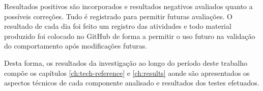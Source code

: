 Resultados positivos são incorporados e resultados negativos avaliados quanto a possíveis correções. Tudo é registrado para permitir futuras avaliações. O resultado de cada dia foi feito um registro das atividades e todo material produzido foi colocado no GitHub de forma a permitir o uso futuro na validação do comportamento após modificações futuras.

Desta forma, os resultados da investigação ao longo do período deste trabalho compõe os capítulos  \ref{ch:tech-reference} e \ref{ch:results} aonde são apresentados os aspectos técnicos de cada componente analisado e resultados dos testes efetuados. 

